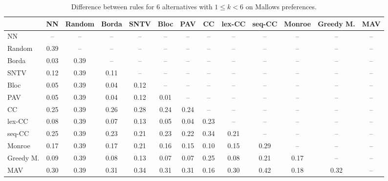 
\begin{table*}[htbp]
\centering
\begin{tabular}{lcccccccccccc}
\toprule
 & NN & Random & Borda & SNTV & Bloc & PAV & CC & lex-CC & seq-CC & Monroe & Greedy M. & MAV \\
\midrule
NN & -- & -- & -- & -- & -- & -- & -- & -- & -- & -- & -- & -- \\
Random & \cellcolor{blue!39} 0.39 & -- & -- & -- & -- & -- & -- & -- & -- & -- & -- & -- \\
Borda & \cellcolor{blue!3} 0.03 & \cellcolor{blue!39} 0.39 & -- & -- & -- & -- & -- & -- & -- & -- & -- & -- \\
SNTV & \cellcolor{blue!12} 0.12 & \cellcolor{blue!39} 0.39 & \cellcolor{blue!11} 0.11 & -- & -- & -- & -- & -- & -- & -- & -- & -- \\
Bloc & \cellcolor{blue!5} 0.05 & \cellcolor{blue!39} 0.39 & \cellcolor{blue!4} 0.04 & \cellcolor{blue!12} 0.12 & -- & -- & -- & -- & -- & -- & -- & -- \\
PAV & \cellcolor{blue!5} 0.05 & \cellcolor{blue!39} 0.39 & \cellcolor{blue!4} 0.04 & \cellcolor{blue!12} 0.12 & \cellcolor{blue!1} 0.01 & -- & -- & -- & -- & -- & -- & -- \\
CC & \cellcolor{blue!25} 0.25 & \cellcolor{blue!39} 0.39 & \cellcolor{blue!26} 0.26 & \cellcolor{blue!28} 0.28 & \cellcolor{blue!24} 0.24 & \cellcolor{blue!24} 0.24 & -- & -- & -- & -- & -- & -- \\
lex-CC & \cellcolor{blue!8} 0.08 & \cellcolor{blue!39} 0.39 & \cellcolor{blue!7} 0.07 & \cellcolor{blue!13} 0.13 & \cellcolor{blue!5} 0.05 & \cellcolor{blue!4} 0.04 & \cellcolor{blue!23} 0.23 & -- & -- & -- & -- & -- \\
seq-CC & \cellcolor{blue!25} 0.25 & \cellcolor{blue!39} 0.39 & \cellcolor{blue!23} 0.23 & \cellcolor{blue!21} 0.21 & \cellcolor{blue!23} 0.23 & \cellcolor{blue!22} 0.22 & \cellcolor{blue!34} 0.34 & \cellcolor{blue!21} 0.21 & -- & -- & -- & -- \\
Monroe & \cellcolor{blue!17} 0.17 & \cellcolor{blue!39} 0.39 & \cellcolor{blue!17} 0.17 & \cellcolor{blue!21} 0.21 & \cellcolor{blue!16} 0.16 & \cellcolor{blue!15} 0.15 & \cellcolor{blue!10} 0.10 & \cellcolor{blue!15} 0.15 & \cellcolor{blue!28} 0.29 & -- & -- & -- \\
Greedy M. & \cellcolor{blue!9} 0.09 & \cellcolor{blue!39} 0.39 & \cellcolor{blue!8} 0.08 & \cellcolor{blue!13} 0.13 & \cellcolor{blue!7} 0.07 & \cellcolor{blue!7} 0.07 & \cellcolor{blue!25} 0.25 & \cellcolor{blue!8} 0.08 & \cellcolor{blue!21} 0.21 & \cellcolor{blue!17} 0.17 & -- & -- \\
MAV & \cellcolor{blue!30} 0.30 & \cellcolor{blue!39} 0.39 & \cellcolor{blue!31} 0.31 & \cellcolor{blue!34} 0.34 & \cellcolor{blue!31} 0.31 & \cellcolor{blue!31} 0.31 & \cellcolor{blue!16} 0.16 & \cellcolor{blue!30} 0.30 & \cellcolor{blue!42} 0.42 & \cellcolor{blue!18} 0.18 & \cellcolor{blue!32} 0.32 & -- \\
\bottomrule
\end{tabular}

\caption{Difference between rules for 6 alternatives with $1 \leq k < 6$ on Mallows preferences.}
\label{tab:rule_distance_heatmap-m=[6]-pref_dist=MALLOWS-RELPHI-R}
\end{table*}
    